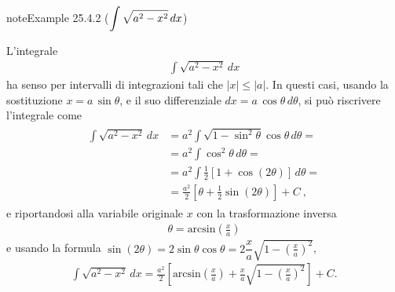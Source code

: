 \documentclass[letterpaper,10pt,italian]{jupyterBook}
\begin{document}
\begin{sphinxadmonition}{note}{Example 25.4.2 (\protect\(\displaystyle \int \sqrt{a^2 - x^2} \,  dx\protect\))}



\sphinxAtStartPar
L’integrale
\begin{equation*}
\begin{split}\int \sqrt{a^2 - x^2} \,  dx\end{split}
\end{equation*}
\sphinxAtStartPar
ha senso per intervalli di integrazioni tali che \(|x| \le |a|\). In questi casi, usando la sostituzione \(x = a \, \sin \theta\), e il suo differenziale \(dx = a \, \cos \theta \, d \theta\), si può riscrivere l’integrale come
\begin{equation*}
\begin{split}\begin{aligned}
  \int \sqrt{a^2 - x^2} \, dx
   & = a^2 \int \sqrt{1- \sin^2 \theta} \cos \theta \, d \theta = \\
   & = a^2 \int \cos^2 \theta \, d \theta = \\
   & = a^2 \int \frac{1}{2} \left[ 1 + \cos \left( 2 \theta \right) \right] \, d \theta = \\
   & = \frac{a^2}{2} \left[ \theta + \frac{1}{2} \sin \left( 2 \theta \right) \right] + C \ ,
\end{aligned}\end{split}
\end{equation*}
\sphinxAtStartPar
e riportandosi alla variabile originale \(x\) con la trasformazione inversa
\begin{equation*}
\begin{split} \theta = \text{arcsin} \left(\frac{x}{a}\right) \end{split}
\end{equation*}
\sphinxAtStartPar
e usando la formula \(\sin( 2 \theta ) = 2 \sin \theta \cos \theta = 2 \dfrac{x}{a} \sqrt{1 - \left( \frac{x}{a} \right)^2}\),
\begin{equation*}
\begin{split}\int \sqrt{a^2 - x^2} \, dx = \frac{a^2}{2} \left[ \text{arcsin}\left( \frac{x}{a} \right) + \frac{x}{a}\sqrt{1 - \left( \frac{x}{a} \right)^2 }\right] + C .\end{split}
\end{equation*}\end{sphinxadmonition}
\label{ch/infinitesimal_calculus/integrals:example-8}
\end{document}
